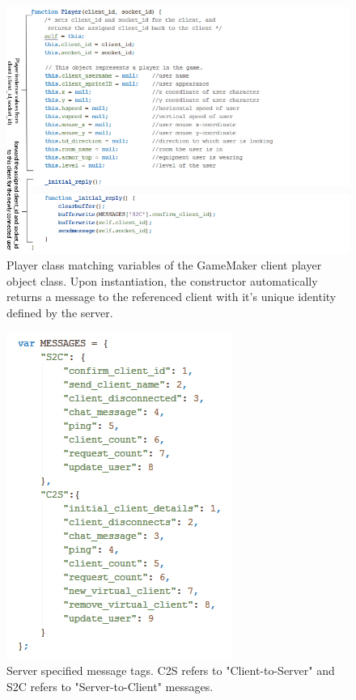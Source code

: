 \documentclass[bsc, 12pt, twoside, singlespacing, parskip, abbrevs, notimes, normalheadings, logo]{styles/infthesis}
\begin{document}
\begin{figure}[H]
\includegraphics[scale=0.75]{images/server_player_construct.jpg}
\caption{Player class matching variables of the GameMaker client player object class. Upon instantiation, the constructor automatically returns a message to the referenced client with it's unique identity defined by the server.}
\label{fig:server_player_construct}
\vspace{1em}
\end{figure}

\begin{figure}[H]
\includegraphics[scale=0.75]{images/server_message_tags.jpg}
\caption{Server specified message tags. C2S refers to "Client-to-Server" and S2C refers to "Server-to-Client" messages.}
\label{fig:server_message_tags}
\vspace{1em}
\end{figure}
\end{document}
